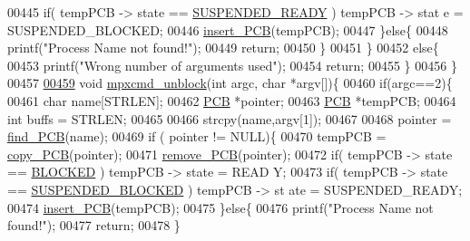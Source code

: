 \begin{DoxyCode}
{{00445                         \textcolor{keywordflow}{if}( tempPCB -> state == \hyperlink{mpx__r2_8h_a07b1141143e8825b04670da23fca8cc7}{SUSPENDED_READY} ) tempPCB -> stat
      e = SUSPENDED\_BLOCKED;
00446                         \hyperlink{mpx__r2_8c_aa3b334e3a5afd6e590917667ad359a6f}{insert_PCB}(tempPCB);
00447                 \}\textcolor{keywordflow}{else}\{
00448                         printf(\textcolor{stringliteral}{"Process Name not found!"});
00449                         \textcolor{keywordflow}{return};
00450                 \}
00451         \}
00452         \textcolor{keywordflow}{else}\{
00453                 printf(\textcolor{stringliteral}{"Wrong number of arguments used"});       
00454                 \textcolor{keywordflow}{return};
00455         \}       
00456 \}
00457 
\hypertarget{mpx__r2_8c_source_l00459}{}\hyperlink{mpx__r2_8h_a1363a7b6156a84057936c3fd91d91f69}{00459} \textcolor{keywordtype}{void} \hyperlink{mpx__r2_8c_a1363a7b6156a84057936c3fd91d91f69}{mpxcmd_unblock}(\textcolor{keywordtype}{int} argc, \textcolor{keywordtype}{char} *argv[])\{
00460         \textcolor{keywordflow}{if}(argc==2)\{
00461                 \textcolor{keywordtype}{char} name[STRLEN];
00462                 \hyperlink{structprocess}{PCB} *pointer;
00463                 \hyperlink{structprocess}{PCB} *tempPCB;
00464                 \textcolor{keywordtype}{int} buffs = STRLEN;
00465                 
00466                 strcpy(name,argv[1]);
00467                 
00468                 pointer = \hyperlink{mpx__r2_8c_a612a6abcb66c688a32f33abc93ff3990}{find_PCB}(name);
00469                 \textcolor{keywordflow}{if} ( pointer != NULL)\{
00470                         tempPCB = \hyperlink{mpx__r2_8c_aca3ad02d2b4c68f7653b0adf2c484ff6}{copy_PCB}(pointer);
00471                         \hyperlink{mpx__r2_8c_af30a3658210d449b4b53e5be2ed2bc2e}{remove_PCB}(pointer);
00472                         \textcolor{keywordflow}{if}( tempPCB -> state == \hyperlink{mpx__r2_8h_a48f6457243719e7031768d4100741159}{BLOCKED} ) tempPCB -> state = READ
      Y;
00473                         \textcolor{keywordflow}{if}( tempPCB -> state == \hyperlink{mpx__r2_8h_a6e41bb5a80c5049e8d364bab8ee4d73a}{SUSPENDED_BLOCKED} ) tempPCB -> st
      ate = SUSPENDED\_READY;
00474                         \hyperlink{mpx__r2_8c_aa3b334e3a5afd6e590917667ad359a6f}{insert_PCB}(tempPCB);
00475                 \}\textcolor{keywordflow}{else}\{
00476                         printf(\textcolor{stringliteral}{"Process Name not found!"});
00477                         \textcolor{keywordflow}{return};
00478                 \}
}}
\end{DoxyCode}
